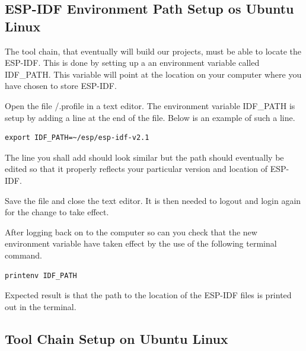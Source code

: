 \documentclass{tufte-book}
\begin{document}
\subsection{ESP-IDF Environment Path Setup os Ubuntu Linux}


The tool chain, that eventually will build our projects, must be able to locate the ESP-IDF. This is done by setting up a an environment variable called IDF\_PATH. This variable will point at the location on your computer where you have chosen to store ESP-IDF.

Open the file \texttildelow/.profile in a text editor. The environment variable IDF\_PATH is setup by adding a line at the end of the file. Below is an example of such a line.


\begin{lstlisting}
export IDF_PATH=~/esp/esp-idf-v2.1
\end{lstlisting}

The line you shall add should look similar but the path should  eventually be edited so that it properly reflects your particular version and location of ESP-IDF.

Save the file and close the text editor. It is then needed to logout and login again for the change to take effect.

After logging back on to the computer so can you check that the new environment variable have taken effect by the use of the following terminal command.

\begin{lstlisting}
printenv IDF_PATH
\end{lstlisting}

Expected result is that the path to the location of the ESP-IDF files is printed out in the terminal.

\subsection{Tool Chain Setup on Ubuntu Linux}
\end{document}
